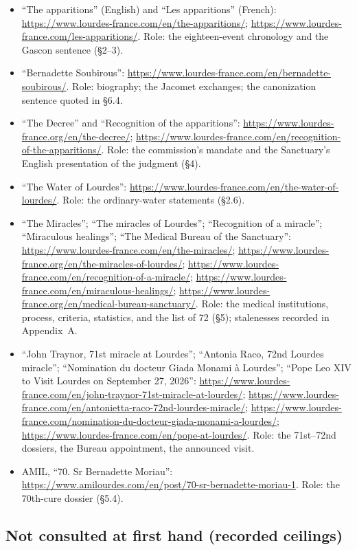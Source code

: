 \begin{itemize}
\item ``The apparitions'' (English) and ``Les apparitions''
(French):
\url{https://www.lourdes-france.com/en/the-apparitions/};
\url{https://www.lourdes-france.com/les-apparitions/}. Role: the
eighteen-event chronology and the Gascon sentence (\S2--3).
\item ``Bernadette Soubirous'':
\url{https://www.lourdes-france.com/en/bernadette-soubirous/}.
Role: biography; the Jacomet exchanges; the canonization
sentence quoted in \S6.4.
\item ``The Decree'' and ``Recognition of the apparitions'':
\url{https://www.lourdes-france.org/en/the-decree/};
\url{https://www.lourdes-france.com/en/recognition-of-the-apparitions/}.
Role: the commission's mandate and the Sanctuary's English
presentation of the judgment (\S4).
\item ``The Water of Lourdes'':
\url{https://www.lourdes-france.com/en/the-water-of-lourdes/}.
Role: the ordinary-water statements (\S2.6).
\item ``The Miracles''; ``The miracles of Lourdes'';
``Recognition of a miracle''; ``Miraculous healings''; ``The
Medical Bureau of the Sanctuary'':
\url{https://www.lourdes-france.com/en/the-miracles/};
\url{https://www.lourdes-france.org/en/the-miracles-of-lourdes/};
\url{https://www.lourdes-france.com/en/recognition-of-a-miracle/};
\url{https://www.lourdes-france.com/en/miraculous-healings/};
\url{https://www.lourdes-france.org/en/medical-bureau-sanctuary/}.
Role: the medical institutions, process, criteria, statistics,
and the list of 72 (\S5); stalenesses recorded in Appendix~A.
\item ``John Traynor, 71st miracle at Lourdes''; ``Antonia Raco,
72nd Lourdes miracle''; ``Nomination du docteur Giada Monami \`a
Lourdes''; ``Pope Leo XIV to Visit Lourdes on September 27,
2026'':
\url{https://www.lourdes-france.com/en/john-traynor-71st-miracle-at-lourdes/};
\url{https://www.lourdes-france.com/en/antonietta-raco-72nd-lourdes-miracle/};
\url{https://www.lourdes-france.com/nomination-du-docteur-giada-monami-a-lourdes/};
\url{https://www.lourdes-france.com/en/pope-at-lourdes/}. Role:
the 71st--72nd dossiers, the Bureau appointment, the announced
visit.
\item AMIL, ``70. Sr Bernadette Moriau'':
\url{https://www.amilourdes.com/en/post/70-sr-bernadette-moriau-1}.
Role: the 70th-cure dossier (\S5.4).
\end{itemize}

\subsection*{Not consulted at first hand (recorded ceilings)}


